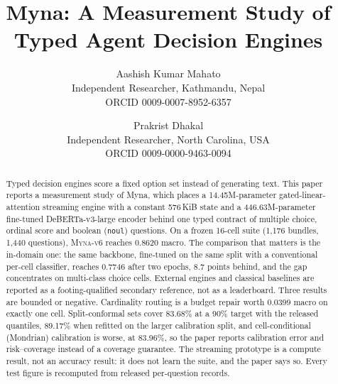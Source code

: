 \documentclass[11pt]{article}
\title{Myna: A Measurement Study of Typed Agent Decision Engines}
\author{Aashish Kumar Mahato \\ Independent Researcher, Kathmandu, Nepal \\
 ORCID 0009-0007-8952-6357 \and Prakrist Dhakal \\ Independent Researcher, North Carolina, USA \\
 ORCID 0009-0000-9463-0094}
\newcommand{\vsix}{\textsc{Myna-v6}}
\begin{document}
\maketitle
\begin{abstract}
Typed decision engines score a fixed option set instead of generating text. This paper reports a
measurement study of Myna, which places a 14.45M-parameter gated-linear-attention streaming engine
with a constant 576\,KiB state and a 446.63M-parameter fine-tuned DeBERTa-v3-large encoder behind one
typed contract of multiple choice, ordinal score and boolean (\texttt{noul}) questions. On a frozen
16-cell suite (1,176 bundles, 1,440 questions), \vsix{} reaches 0.8620 macro. The comparison that
matters is the in-domain one: the same backbone, fine-tuned on the same split with a conventional
per-cell classifier, reaches 0.7746 after two epochs, 8.7 points behind, and the gap concentrates on
multi-class choice cells. External engines and classical baselines are reported as a
footing-qualified secondary reference, not as a leaderboard. Three results are bounded or negative.
Cardinality routing is a budget repair worth 0.0399 macro on exactly one cell. Split-conformal sets
cover 83.68\% at a 90\% target with the released quantiles, 89.17\% when refitted on the larger
calibration split, and cell-conditional (Mondrian) calibration is worse, at 83.96\%, so the paper
reports calibration error and risk--coverage instead of a coverage guarantee. The streaming
prototype is a compute result, not an accuracy result: it does not learn the suite, and the paper
says so. Every test figure is recomputed from released per-question records.
\end{abstract}






\appendix

\end{document}
